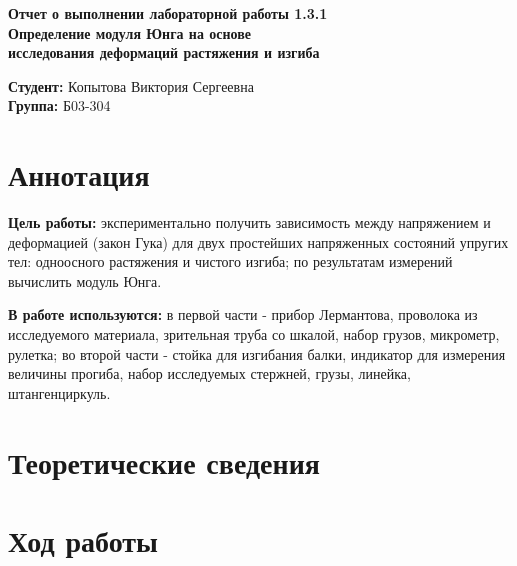 \documentclass[a4paper,12 pt]{article}
\begin{document}
    \begin{titlepage}
    \begin{center}
        \vspace{4cm}
        \huge {\textbf{Отчет о выполнении лабораторной работы 1.3.1 }}
        {} \\
        \vspace{1cm}
        \Large {\textbf{Определение модуля Юнга на основе}} \\
        \Large {\textbf{исследования деформаций растяжения и изгиба}} \\
        \vspace{10cm}
        \begin{flushright}
        \begin{minipage}{.45\textwidth}
        \normalsize{\textbf{Студент:} Копытова Виктория Сергеевна}\\
        \textbf{Группа:} Б03-304\\
        \end{minipage}
        \end{flushright}   
    \end{center}
    \end{titlepage}
\newpage
 
\section{Аннотация}
\textbf{Цель работы:} экспериментально получить зависимость между напряжением и деформацией (закон Гука) для двух простейших напряженных состояний упругих тел: одноосного растяжения и чистого изгиба; по результатам измерений вычислить модуль Юнга.

\textbf{В работе используются:} в первой части - прибор Лермантова, проволока из исследуемого материала, зрительная труба со шкалой, набор грузов, микрометр, рулетка; во второй части - стойка для изгибания балки, индикатор для измерения величины прогиба, набор исследуемых стержней, грузы, линейка, штангенциркуль.
	

\section{Теоретические сведения}





\section{Ход работы}
\end{document}
